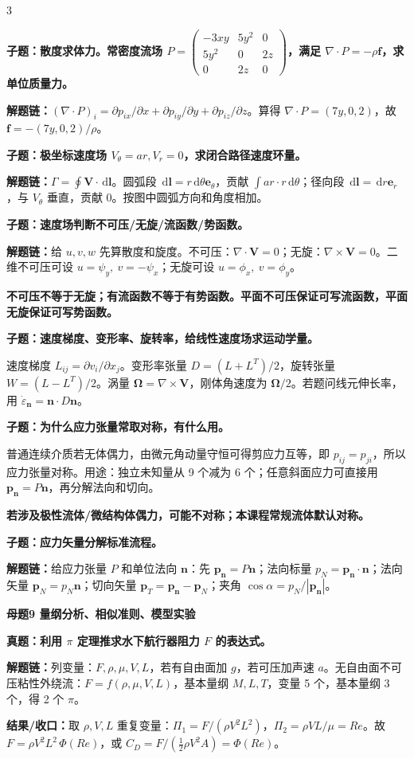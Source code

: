 \documentclass[a4paper]{article}
\newcommand{\mt}[1]{\vspace{0.45pt}\colorbox{M}{\parbox{\dimexpr\linewidth-2\fboxsep}{\color{white}\bfseries #1}}\par}
\newcommand{\qt}[1]{\vspace{0.25pt}\colorbox{Q}{\parbox{\dimexpr\linewidth-2\fboxsep}{\color{white}\bfseries #1}}\par}
\newcommand{\ans}[1]{\colorbox{G}{\parbox{\dimexpr\linewidth-2\fboxsep}{#1}}\par}
\newcommand{\warn}[1]{\colorbox{Y}{\parbox{\dimexpr\linewidth-2\fboxsep}{\color{E}\bfseries #1}}\par}
\newcommand{\chain}[1]{{\color{A}\bfseries 解题链：}#1\par}
\newcommand{\res}[1]{{\color{E}\bfseries 结果/收口：}#1\par}
\newcommand{\dd}{\,\mathrm d}
\begin{document}
\begin{multicols}{3}
\qt{子题：散度求体力。常密度流场 $P=\begin{pmatrix}-3xy&5y^2&0\\5y^2&0&2z\\0&2z&0\end{pmatrix}$，满足 $\nabla\cdot P=-\rho\bm f$，求单位质量力。}
\chain{$(\nabla\cdot P)_i=\partial p_{ix}/\partial x+\partial p_{iy}/\partial y+\partial p_{iz}/\partial z$。算得 $\nabla\cdot P=(7y,0,2)$，故 $\bm f=-(7y,0,2)/\rho$。}

\qt{子题：极坐标速度场 $V_\theta=ar,V_r=0$，求闭合路径速度环量。}
\chain{$\Gamma=\oint\bm V\cdot\dd\bm l$。圆弧段 $\dd\bm l=r\dd\theta\bm e_\theta$，贡献 $\int ar\cdot r\dd\theta$；径向段 $\dd\bm l=\dd r\bm e_r$，与 $V_\theta$ 垂直，贡献 0。按图中圆弧方向和角度相加。}

\qt{子题：速度场判断不可压/无旋/流函数/势函数。}
\chain{给 $u,v,w$ 先算散度和旋度。不可压：$\nabla\cdot\bm V=0$；无旋：$\nabla\times\bm V=0$。二维不可压可设 $u=\psi_y,\ v=-\psi_x$；无旋可设 $u=\phi_x,\ v=\phi_y$。}
\warn{不可压不等于无旋；有流函数不等于有势函数。平面不可压保证可写流函数，平面无旋保证可写势函数。}

\qt{子题：速度梯度、变形率、旋转率，给线性速度场求运动学量。}
\ans{速度梯度 $L_{ij}=\partial v_i/\partial x_j$。变形率张量 $D=(L+L^T)/2$，旋转张量 $W=(L-L^T)/2$。涡量 $\bm\Omega=\nabla\times\bm V$，刚体角速度为 $\bm\Omega/2$。若题问线元伸长率，用 $\dot\varepsilon_{\bm n}=\bm n\cdot D\bm n$。}

\qt{子题：为什么应力张量常取对称，有什么用。}
\ans{普通连续介质若无体偶力，由微元角动量守恒可得剪应力互等，即 $p_{ij}=p_{ji}$，所以应力张量对称。用途：独立未知量从 9 个减为 6 个；任意斜面应力可直接用 $\bm p_{\bm n}=P\bm n$，再分解法向和切向。}
\warn{若涉及极性流体/微结构体偶力，可能不对称；本课程常规流体默认对称。}

\qt{子题：应力矢量分解标准流程。}
\chain{给应力张量 $P$ 和单位法向 $\bm n$：先 $\bm p_{\bm n}=P\bm n$；法向标量 $p_N=\bm p_{\bm n}\cdot\bm n$；法向矢量 $\bm p_N=p_N\bm n$；切向矢量 $\bm p_T=\bm p_{\bm n}-\bm p_N$；夹角 $\cos\alpha=p_N/|\bm p_{\bm n}|$。}


\mt{母题9 量纲分析、相似准则、模型实验}
\qt{真题：利用 $\pi$ 定理推求水下航行器阻力 $F$ 的表达式。}
\chain{列变量：$F,\rho,\mu,V,L$，若有自由面加 $g$，若可压加声速 $a$。无自由面不可压粘性外绕流：$F=f(\rho,\mu,V,L)$，基本量纲 $M,L,T$，变量 5 个，基本量纲 3 个，得 2 个 $\pi$。}
\res{取 $\rho,V,L$ 重复变量：$\Pi_1=F/(\rho V^2L^2)$，$\Pi_2=\rho VL/\mu=Re$。故 $F=\rho V^2L^2\,\Phi(Re)$，或 $C_D=F/(\frac12\rho V^2A)=\Phi(Re)$。}


\end{multicols}
\end{document}
